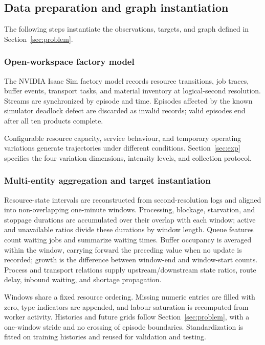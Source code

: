 \documentclass[a4paper,fleqn]{cas-dc}
\begin{document}
\subsection{Data preparation and graph instantiation}

The following steps instantiate the observations, targets, and graph defined in Section~\ref{sec:problem}.

\subsubsection{Open-workspace factory model}

The NVIDIA Isaac Sim factory model records resource transitions, job traces, buffer events, transport tasks, and material inventory at logical-second resolution. Streams are synchronized by episode and time. Episodes affected by the known simulator deadlock defect are discarded as invalid records; valid episodes end after all ten products complete.

Configurable resource capacity, service behaviour, and temporary operating variations generate trajectories under different conditions. Section~\ref{sec:exp} specifies the four variation dimensions, intensity levels, and collection protocol.

\subsubsection{Multi-entity aggregation and target instantiation}

Resource-state intervals are reconstructed from second-resolution logs and aligned into non-overlapping one-minute windows. Processing, blockage, starvation, and stoppage durations are accumulated over their overlap with each window; active and unavailable ratios divide these durations by window length. Queue features count waiting jobs and summarize waiting times. Buffer occupancy is averaged within the window, carrying forward the preceding value when no update is recorded; growth is the difference between window-end and window-start counts. Process and transport relations supply upstream/downstream state ratios, route delay, inbound waiting, and shortage propagation.

Windows share a fixed resource ordering. Missing numeric entries are filled with zero, type indicators are appended, and labour saturation is recomputed from worker activity. Histories and future grids follow Section~\ref{sec:problem}, with a one-window stride and no crossing of episode boundaries. Standardization is fitted on training histories and reused for validation and testing.
\end{document}
